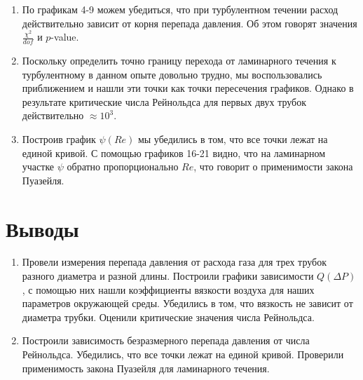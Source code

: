 \documentclass[a4paper]{article}
\begin{document}
\begin{enumerate}
\item По графикам 4-9 можем убедиться, что при турбулентном течении расход действительно зависит от корня перепада давления. Об этом говорят значения $\frac{\chi^2}{dof}$ и $p$-value.
\item Поскольку определить точно границу перехода от ламинарного течения к турбулентному в данном опыте довольно трудно, мы воспользовались приближением и нашли эти точки как точки пересечения графиков. Однако в результате критические числа Рейнольдса для первых двух трубок действительно $\approx 10^3$.
\item Построив график $\psi(Re)$ мы убедились в том, что все точки лежат на единой кривой. С помощью графиков 16-21 видно, что на ламинарном участке $\psi$ обратно пропорционально $Re$, что говорит о применимости закона Пуазейля.
\end{enumerate}
\section{Выводы}
\begin{enumerate}
\item Провели измерения перепада давления от расхода газа для трех трубок разного диаметра и разной длины. Построили графики зависимости $Q(\Delta P)$, с помощью них нашли коэффициенты вязкости воздуха для наших параметров окружающей среды. Убедились в том, что вязкость не зависит от диаметра трубки. Оценили критические значения числа Рейнольдса. 
\item Построили зависимость безразмерного перепада давления от числа Рейнольдса. Убедились, что все точки лежат на единой кривой. Проверили применимость закона Пуазейля для ламинарного течения.
\end{enumerate}
\end{document}
